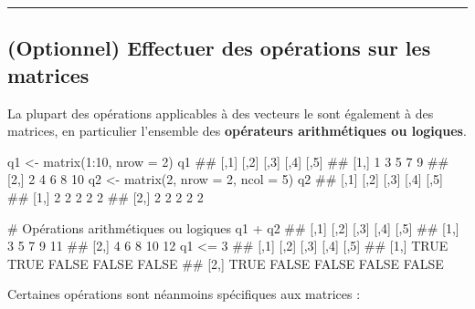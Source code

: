 \documentclass[12pt,twosided, notitlepage]{book}
\newenvironment{Shaded}{}{}
\newcommand{\KeywordTok}[1]{\textcolor[rgb]{0.00,0.00,1.00}{{#1}}}
\newcommand{\DataTypeTok}[1]{{#1}}
\newcommand{\DecValTok}[1]{{#1}}
\newcommand{\StringTok}[1]{\textcolor[rgb]{0.00,0.50,0.50}{{#1}}}
\newcommand{\CommentTok}[1]{\textcolor[rgb]{0.00,0.50,0.00}{{#1}}}
\newcommand{\NormalTok}[1]{{#1}}
\renewenvironment{Shaded}{\begin{snugshade}}{\end{snugshade}}
\begin{document}
\begin{enumerate}
  \begin{center} \rule{0.5\linewidth}{\linethickness}\end{center}

  \bigskip  \fi 
\end{enumerate}

\subsection{(Optionnel) Effectuer des opérations sur les
matrices}\label{optionnel-effectuer-des-operations-sur-les-matrices}

La plupart des opérations applicables à des vecteurs le sont également à
des matrices, en particulier l'ensemble des \textbf{opérateurs
arithmétiques ou logiques}\index{\texttt{+}}\index{\texttt{<=}}.

\begin{Shaded}
\begin{Highlighting}[]
\NormalTok{q1 <-}\StringTok{ }\KeywordTok{matrix}\NormalTok{(}\DecValTok{1}\NormalTok{:}\DecValTok{10}\NormalTok{, }\DataTypeTok{nrow =} \DecValTok{2}\NormalTok{)}
\NormalTok{q1}
  \NormalTok{##      [,1] [,2] [,3] [,4] [,5]}
  \NormalTok{## [1,]    1    3    5    7    9}
  \NormalTok{## [2,]    2    4    6    8   10}
\NormalTok{q2 <-}\StringTok{ }\KeywordTok{matrix}\NormalTok{(}\DecValTok{2}\NormalTok{, }\DataTypeTok{nrow =} \DecValTok{2}\NormalTok{, }\DataTypeTok{ncol =} \DecValTok{5}\NormalTok{)}
\NormalTok{q2}
  \NormalTok{##      [,1] [,2] [,3] [,4] [,5]}
  \NormalTok{## [1,]    2    2    2    2    2}
  \NormalTok{## [2,]    2    2    2    2    2}

\CommentTok{# Opérations arithmétiques ou logiques}
\NormalTok{q1 +}\StringTok{ }\NormalTok{q2}
  \NormalTok{##      [,1] [,2] [,3] [,4] [,5]}
  \NormalTok{## [1,]    3    5    7    9   11}
  \NormalTok{## [2,]    4    6    8   10   12}
\NormalTok{q1 <=}\StringTok{ }\DecValTok{3}
  \NormalTok{##      [,1]  [,2]  [,3]  [,4]  [,5]}
  \NormalTok{## [1,] TRUE  TRUE FALSE FALSE FALSE}
  \NormalTok{## [2,] TRUE FALSE FALSE FALSE FALSE}
\end{Highlighting}
\end{Shaded}

Certaines opérations sont néanmoins spécifiques aux matrices :
\end{document}
